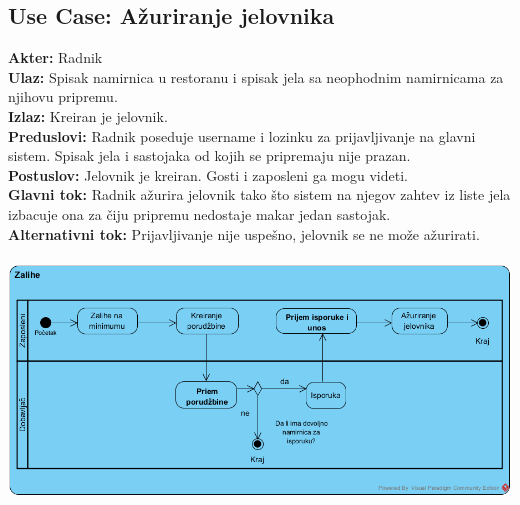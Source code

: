 \documentclass{article}
\begin{document}
\subsection{\textbf{Use Case}: Ažuriranje jelovnika}
\textbf{Akter:} Radnik\\
\textbf{Ulaz:} Spisak namirnica u restoranu i spisak jela sa neophodnim namirnicama za njihovu pripremu.\\
\textbf{Izlaz:} Kreiran je jelovnik.\\
\textbf{Preduslovi:} Radnik poseduje username i lozinku za prijavljivanje na glavni sistem. Spisak jela i sastojaka od kojih se pripremaju nije prazan.\\
\textbf{Postuslov:} Jelovnik je kreiran. Gosti i zaposleni ga mogu videti.\\
\textbf{Glavni tok:} Radnik ažurira jelovnik tako što sistem na njegov zahtev iz liste jela izbacuje ona za čiju pripremu nedostaje makar jedan sastojak.\\
\textbf{Alternativni tok:} Prijavljivanje nije uspešno, jelovnik se ne može ažurirati.\\ \\
\includegraphics[width=\textwidth]{zalihe-activity.png}
\end{document}
